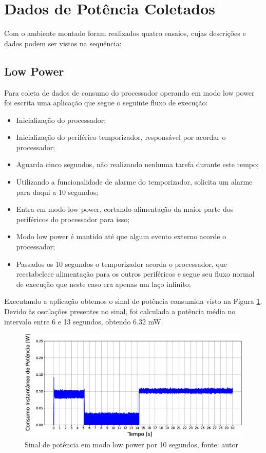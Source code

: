 \documentclass[a5paper]{ufsc-thesis}  %
\begin{document}
\section{Dados de Potência Coletados}
Com o ambiente montado foram realizados quatro ensaios, cujas descrições e dados podem ser vistos na sequência:
\subsection{Low Power}
Para coleta de dados de consumo do processador operando em modo low power foi escrita uma aplicação que segue o seguinte fluxo de execução:
\begin{itemize}
    \item Inicialização do processador;
    \item Inicialização do periférico temporizador, responsável por acordar o processador;
    \item Aguarda cinco segundos, não realizando nenhuma tarefa durante este tempo;
    \item Utilizando a funcionalidade de alarme do temporizador, solicita um alarme para daqui a 10 segundos;
    \item Entra em modo low power, cortando alimentação da maior parte dos periféricos do processador para isso;
    \item Modo low power é mantido até que algum evento externo acorde o processador;
    \item Passados os 10 segundos o temporizador acorda o processador, que reestabelece alimentação para os outros periféricos e segue seu fluxo normal de execução que neste caso era apenas um laço infinito;
\end{itemize}

Executando a aplicação obtemos o sinal de potência consumida visto na Figura \ref{fig:low_power}. Devido às oscilações presentes no sinal, foi calculada a potência média no intervalo entre 6 e 13 segundos, obtendo 6.32 mW. 

\begin{figure}[!ht]
    \centering
    \includegraphics[width=1\linewidth]{imagens/low_power.eps}
    \caption{Sinal de potência em modo low power por 10 segundos, fonte: autor}
    \label{fig:low_power}
\end{figure}
\end{document}
